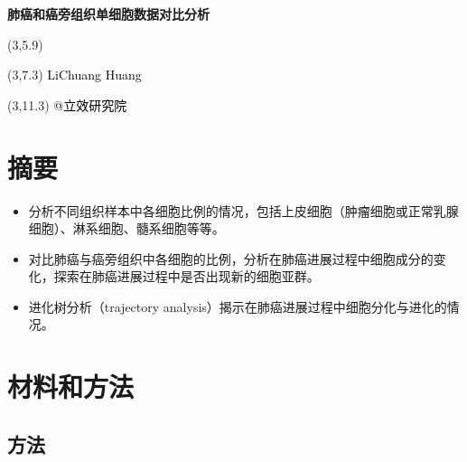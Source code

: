 \documentclass[
]{article}
\author{}
\date{\vspace{-2.5em}}
\providecommand{\tightlist}{%
  \setlength{\itemsep}{0pt}\setlength{\parskip}{0pt}}
\begin{document}
\begin{titlepage} 
\begin{center} \textbf{\Huge
肺癌和癌旁组织单细胞数据对比分析} \vspace{4em}
\begin{textblock}{10}(3,5.9) \huge
\textbf{\textcolor{white}{2023-11-27}}
\end{textblock} \begin{textblock}{10}(3,7.3)
\Large \textcolor{black}{LiChuang Huang}
\end{textblock} \begin{textblock}{10}(3,11.3)
\Large \textcolor{black}{@立效研究院}
\end{textblock} \end{center} \end{titlepage}
\restoregeometry


\tableofcontents

\listoffigures

\listoftables

\newpage


\hypertarget{abstract}{%
\section{摘要}\label{abstract}}

\begin{itemize}
\tightlist
\item
  分析不同组织样本中各细胞比例的情况，包括上皮细胞（肿瘤细胞或正常乳腺细胞）、淋系细胞、髓系细胞等等。
\item
  对比肺癌与癌旁组织中各细胞的比例，分析在肺癌进展过程中细胞成分的变化，探索在肺癌进展过程中是否出现新的细胞亚群。
\item
  进化树分析（trajectory analysis）揭示在肺癌进展过程中细胞分化与进化的情况。
\end{itemize}

\hypertarget{methods}{%
\section{材料和方法}\label{methods}}

\hypertarget{ux65b9ux6cd5}{%
\subsection{方法}\label{ux65b9ux6cd5}}
\end{document}
